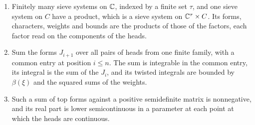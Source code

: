 \begin{proposition}\label{prop:sieve-products}
\begin{enumerate}[label=\textup{(\alph*)}]
\item Finitely many sieve systems on $\mathbb{C}$, indexed by a finite set $\tau$, and one sieve system on $C$ have a product, which is a sieve system on $\mathbb{C}^\tau\times C$. Its forms, characters,
weights and bounds are the products of those of the factors, each factor read on the components of the heads.
\item Sum the forms $J_{i+1}$ over all pairs of heads from one finite family, with a common entry at position $i\le n$. The sum is integrable in the common entry, its integral is the sum of the
$J_i$, and its twisted integrals are bounded by $\beta(\xi)$ and the squared sums of the weights.
\item Such a sum of top forms against a positive semidefinite matrix is nonnegative, and its real part is lower semicontinuous in a parameter at each point at which the heads are continuous.
\end{enumerate}
\end{proposition}

